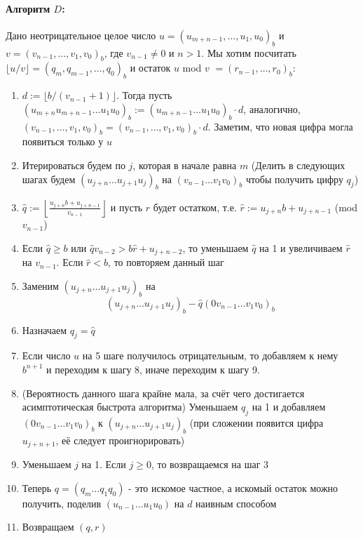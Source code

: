 \documentclass{article}
\begin{document}
   \paragraph{Алгоритм $D$:} Дано неотрицательное целое число $u = (u_{m+n-1},\dots,u_1,u_0)_b$ и $v = (v_{n-1},\dots,v_1,v_0)_b$, где $v_{n-1}\neq 0$ и $n>1$. Мы хотим посчитать $\lfloor u/v\rfloor = (q_m,q_{m-1},\dots,q_0)_b$ и остаток $u$ mod $v$ $= (r_{n-1},\dots,r_0)_b$:

   \begin{enumerate}
     \item $d:=\lfloor b/(v_{n-1}+1)\rfloor$. Тогда пусть $(u_{m+n}u_{m+n-1}\dots u_1u_0)_b:=(u_{m+n-1}\dots u_1u_0)_b\cdot d$, аналогично, $(v_{n-1},\dots,v_1,v_0)_b =(v_{n-1},\dots,v_1,v_0)_b\cdot d$. Заметим, что новая цифра могла появиться только у $u$
     \item Итерироваться будем по $j$, которая в начале равна $m$ (Делить в следующих шагах будем $(u_{j+n}\dots u_{j+1}u_j)_b$ на $(v_{n-1}\dots v_1v_0)_b$ чтобы получить цифру $q_j$) 
     \item $\hat{q} := \left\lfloor \frac{u_{j+n}b + u_{j+n-1}}{v_{n-1}}\right\rfloor$ и пусть $\hat{r}$ будет остатком, т.е. $\hat{r} :=u_{j+n}b + u_{j+n-1}$ (mod $v_{n-1}$)
     \item Если $\hat{q}\geqslant b$ или $\hat{q}v_{n-2}>b\hat{r} + u_{j+n-2}$, то уменьшаем $\hat{q}$ на 1 и увеличиваем $\hat{r}$ на $v_{n-1}$. Если $\hat{r}<b$, то повторяем данный шаг
     \item Заменим $(u_{j+n}\dots u_{j+1}u_j)_b$ на
     \[(u_{j+n}\dots u_{j+1}u_j)_b - \hat{q}(0v_{n-1}\dots v_1v_0)_b\]
     \item Назначаем $q_j = \hat{q}$
     \item Если число $u$ на 5 шаге получилось отрицательным, то добавляем к нему $b^{n+1}$ и переходим к шагу 8, иначе переходим к шагу 9.
     \item (Вероятность данного шага крайне мала, за счёт чего достигается асимптотическая быстрота алгоритма) Уменьшаем $q_j$ на 1 и добавляем $(0v_{n-1}\dots v_1v_0)_b$ к $(u_{j+n}\dots u_{j+1}u_j)_b$ (при сложении появится цифра $u_{j+n+1}$, её следует проигнорировать)
     \item Уменьшаем $j$ на 1. Если $j\geqslant 0$, то возвращаемся на шаг 3
     \item Теперь $q=(q_m\dots q_1q_0)$ - это искомое частное, а искомый остаток можно получить, поделив $(u_{n-1}\dots u_1u_0)$ на $d$ наивным способом 
     \item Возвращаем $(q,r)$
   \end{enumerate}
\end{document}
